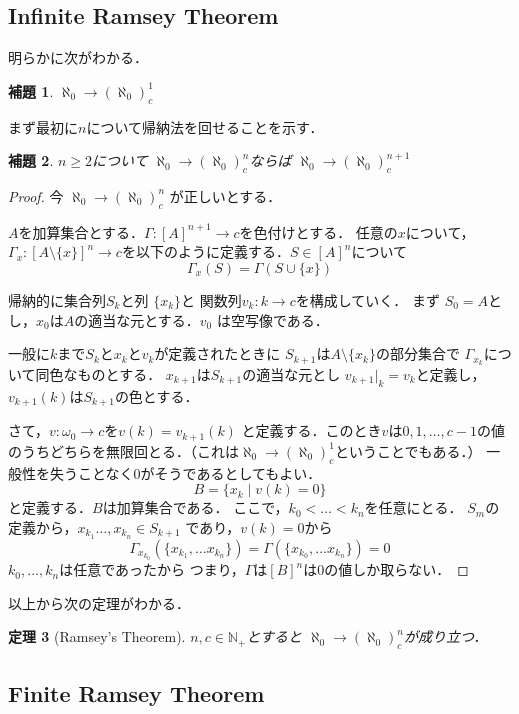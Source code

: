 \documentclass[leqno, 12pt]{jsarticle}
\newtheorem{thm}{定理}
\newtheorem{lem}[thm]{補題}
\newcommand{\nn}{\mathbb{N}}
\begin{document}
\subsection{Infinite Ramsey Theorem}
明らかに次がわかる．
\begin{lem}
$\aleph_{0}\to (\aleph_0)_c^1$
\end{lem}
まず最初に$n$について帰納法を回せることを示す．
\begin{lem}
$n\ge 2$について
$\aleph_0\to (\aleph_0)_c^n$ならば
$\aleph_0\to (\aleph_0)_c^{n+1}$
\end{lem}

\begin{proof}
今
$\aleph_0\to (\aleph_0)_c^n$
が正しいとする．

$A$を加算集合とする．$\Gamma:[A]^{n+1}\to c$を色付けとする．
任意の$x$について，$\Gamma_x:[A\setminus \{x\}]^n\to c$を以下のように定義する．$S\in [A]^n$について
\[
\Gamma_x(S)=\Gamma(S\cup\{x\})
\]

 帰納的に集合列$S_k$と列 $\{x_k\}$と
 関数列$v_k:k\to c$を構成していく．
 まず
 $S_0=A$とし，$x_0$は$A$の適当な元とする．$v_0$
 は空写像である．
 

一般に$k$まで$S_k$と$x_k$と$v_{k}$が定義されたときに
$S_{k+1}$は$A\setminus \{x_k\}$の部分集合で
$\Gamma_{x_k}$について同色なものとする．
$x_{k+1}$は$S_{k+1}$の適当な元とし
$v_{k+1}|_{k}=v_k$と定義し，
$v_{k+1}(k)$は$S_{k+1}$の色とする．


さて，$v:\omega_0\to c$を$v(k)=v_{k+1}(k)$
と定義する．このとき$v$は$0, 1, \dots, c-1$の値のうちどちらを無限回とる．（これは$\aleph_0\to (\aleph_0)_c^1$ということでもある．）
一般性を失うことなく$0$がそうであるとしてもよい．
\[
B=\{x_k\mid v(k)=0\}
\]
と定義する．$B$は加算集合である．
ここで，$k_0<\dots<k_n$を任意にとる．
$S_{m}$の定義から，$x_{k_1}\dots, x_{k_n}\in S_{k+1}$
であり，$v(k)=0$から
\[
\Gamma_{x_{k_0}}(\{x_{k_1},\dots x_{k_n}\})
=\Gamma(\{x_{k_0},\dots x_{k_n}\})
=0
\]
$k_0, \dots, k_{n}$は任意であったから
つまり，$\Gamma$は$[B]^{n}$は$0$の値しか取らない．
\end{proof}


以上から次の定理がわかる．
\begin{thm}[Ramsey's Theorem]
$n,c\in \nn_+$とすると
$\aleph_0\to (\aleph_0)_c^n$が成り立つ．
\end{thm}

\subsection{Finite Ramsey Theorem}
\end{document}
